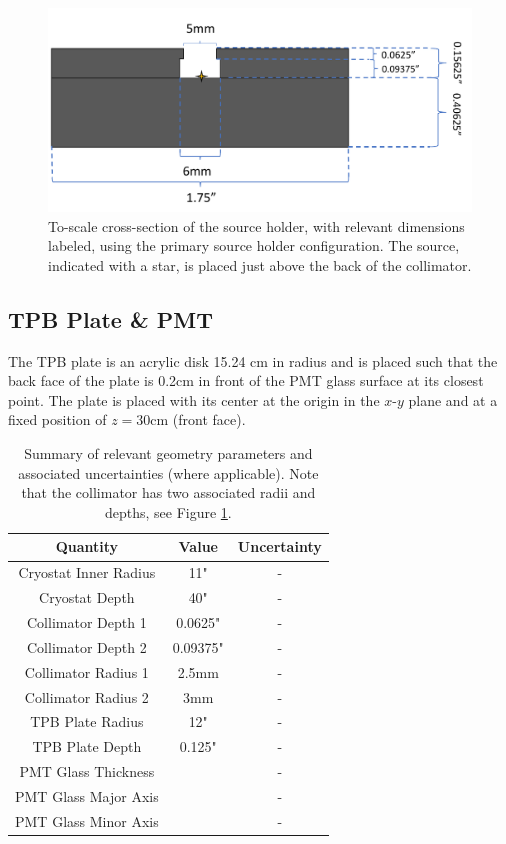 \documentclass[aps,pra,groupedaddress]{revtex4-1}
\begin{document}
\begin{figure}
	\includegraphics[width=1.0\textwidth]{figures/holder}
	\caption{To-scale cross-section of the source holder, with relevant dimensions labeled, using the primary source holder configuration. The source, indicated with a star, is placed just above the back of the collimator. \label{fig:holder}}
\end{figure}

\subsection{TPB Plate \& PMT}

The TPB plate is an acrylic disk 15.24 cm in radius and is placed such that the back face of the plate is 0.2cm in front of the PMT glass surface at its closest point. The plate is placed with its center at the origin in the $x$-$y$ plane and at a fixed position of $z=30$cm (front face).

\begin{table}
	\begin{center}
		\begin{tabular}{| c | c | c |}
			\hline
			Quantity & Value & Uncertainty \\
			\hline
			Cryostat Inner Radius & 11" & - \\
			Cryostat Depth & 40" & - \\
			Collimator Depth 1 & 0.0625" & - \\
			Collimator Depth 2 & 0.09375" & - \\
			Collimator Radius 1 & 2.5mm & - \\
			Collimator Radius 2 & 3mm & - \\
			TPB Plate Radius & 12" & - \\
			TPB Plate Depth & 0.125" & - \\
			PMT Glass Thickness & & - \\
			PMT Glass Major Axis & & - \\
			PMT Glass Minor Axis & & - \\
			\hline
		\end{tabular}
		\caption{Summary of relevant geometry parameters and associated uncertainties (where applicable). Note that the collimator has two associated radii and depths, see Figure \ref{fig:holder}. \label{tab:geo}}
	\end{center}
\end{table}
\end{document}
